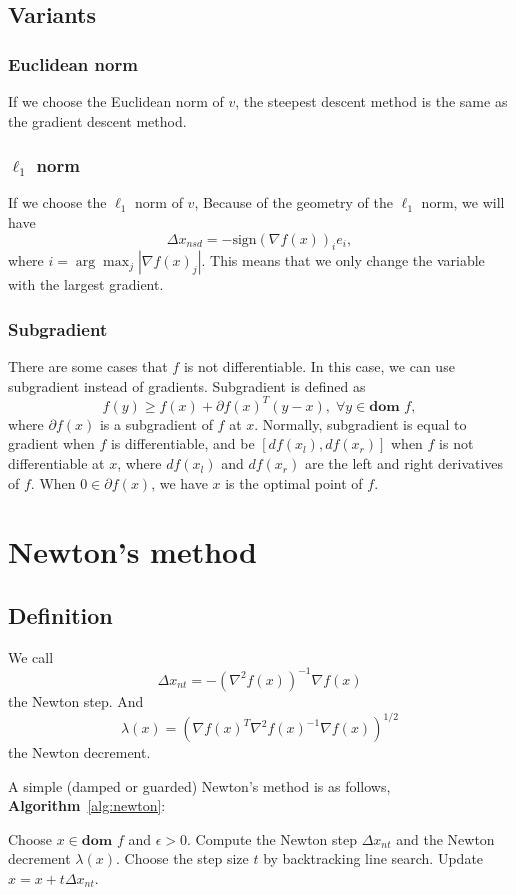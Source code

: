 \documentclass[lang=en,color=blue,mode=fancy,titlestyle=hang]{elegantbook}
\newcommand{\algoref}[1]{\textbf{Algorithm}~\ref{#1}}
\begin{document}
\subsection{Variants}
\subsubsection{Euclidean norm} If we choose the Euclidean norm of $v$, the steepest descent method
is the same as the gradient descent method.

\subsubsection{$\ell_1$ norm} If we choose the $\ell_1$ norm of $v$, Because of the geometry of
the $\ell_1$ norm, we will have
\[
\Delta x_{nsd} = - \text{sign}(\nabla f(x))_i e_i,
\]
where $i = \arg \max_j |\nabla f(x)_j|$. This means that we only change the variable with the largest
gradient.

\subsubsection{Subgradient} There are some cases that $f$ is not differentiable. In this case,
we can use subgradient instead of gradients. Subgradient is defined as
\[
f(y) \geq f(x) + \partial f(x)^T (y - x), \; \forall y \in \textbf{dom } f,
\]
where $\partial f(x)$ is a subgradient of $f$ at $x$. Normally, subgradient is equal to gradient when $f$ is
differentiable, and be $[df(x_l), df(x_r)]$ when $f$ is not differentiable at $x$, where
$df(x_l)$ and $df(x_r)$ are the left and right derivatives of $f$. When $0 \in \partial f(x)$,
we have $x$ is the optimal point of $f$.

\section{Newton's method}
\subsection{Definition}
We call
\[
\Delta x_{nt} = -(\nabla^2 f(x))^{-1} \nabla f(x)
\]
the Newton step. And
\[
\lambda(x) = (\nabla f(x)^T \nabla^2 f(x)^{-1} \nabla f(x))^{1/2}
\]
the Newton decrement.

A simple (damped or guarded) Newton's method is as follows, \algoref{alg:newton}:
\begin{algorithm}[H]
\caption{Newton's method}
\label{alg:newton}
\begin{algorithmic}[1]
\State Choose $x \in \textbf{dom } f$ and $\epsilon > 0$.
\State Compute the Newton step $\Delta x_{nt}$ and the Newton decrement $\lambda(x)$.
\State Choose the step size $t$ by backtracking line search.
\State Update $x = x + t \Delta x_{nt}$.
\EndWhile
\end{algorithmic}
\end{algorithm}
\end{document}
